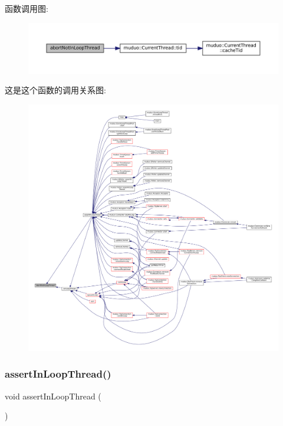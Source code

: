 函数调用图\+:
\nopagebreak
\begin{figure}[H]
\begin{center}
\leavevmode
\includegraphics[width=350pt]{classmuduo_1_1EventLoop_a6375a5e33170fe1ee0fcb82c68b684ba_cgraph}
\end{center}
\end{figure}
这是这个函数的调用关系图\+:
\nopagebreak
\begin{figure}[H]
\begin{center}
\leavevmode
\includegraphics[width=350pt]{classmuduo_1_1EventLoop_a6375a5e33170fe1ee0fcb82c68b684ba_icgraph}
\end{center}
\end{figure}
\mbox{\label{classmuduo_1_1EventLoop_a9e9c23193ece3ba25a1a2779fc7ebc2d}} 
\subsubsection{\texorpdfstring{assert\+In\+Loop\+Thread()}{assertInLoopThread()}}
{\footnotesize\ttfamily void assert\+In\+Loop\+Thread (\begin{DoxyParamCaption}{ }\end{DoxyParamCaption})\hspace{0.3cm}{\ttfamily [inline]}}



